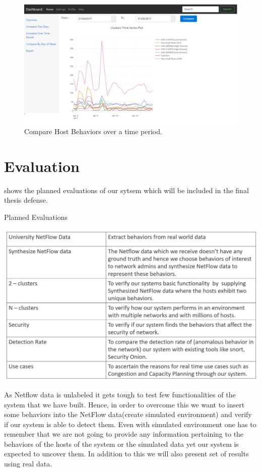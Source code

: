 \begin{figure}[t]
	\centerline{\includegraphics[scale = 0.45]{tool_compare_week.png}}
	\caption{Compare Host Behaviors over a time period.}%
\end{figure} 



\section{Evaluation}

 shows the planned evaluations of our sytsem which will be included in the final thesis defense.

\begin{table}[b]
		\caption{Planned Evaluations}%
	\centerline{\includegraphics[scale = 0.6]{evaluation.png}}
\end{table}


As Netflow data is unlabeled it gets tough to test few functionalities of the system
that we have built. Hence, in order to overcome this we want to insert some behaviors
into the NetFlow data(create simulated environment) and verify if our system is able to
detect them. Even with simulated environment one has to remember that we are not going
to provide any information pertaining to the behaviors of the hosts of the system or the
simulated data yet our system is expected to uncover them. In addition to this we will also
present set of results using real data.




